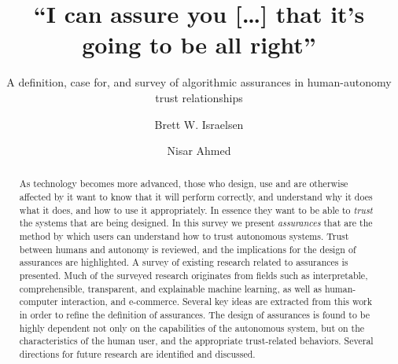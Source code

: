 \documentclass[format=manuscript]{acmart}
\begin{document}
\title{``I can assure you [\ldots] that it's going to be all right''} 
 \subtitle{A definition, case for, and survey of algorithmic assurances in human-autonomy trust relationships}
\author{Brett W. Israelsen}
\author{Nisar Ahmed}

\begin{abstract}
    As technology becomes more advanced, those who design, use and are otherwise affected by it want to know that it will perform correctly, and understand why it does what it does, and how to use it appropriately. In essence they want to be able to \emph{trust} the systems that are being designed. In this survey we present \emph{assurances} that are the method by which users can understand how to trust autonomous systems. Trust between humans and autonomy is reviewed, and the implications for the design of assurances are highlighted. A survey of existing research related to assurances is presented. Much of the surveyed research originates from fields such as interpretable, comprehensible, transparent, and explainable machine learning, as well as human-computer interaction, and e-commerce. Several key ideas are extracted from this work in order to refine the definition of assurances. The design of assurances is found to be highly dependent not only on the capabilities of the autonomous system, but on the characteristics of the human user, and the appropriate trust-related behaviors. Several directions for future research are identified and discussed.
\end{abstract}
\end{document}
